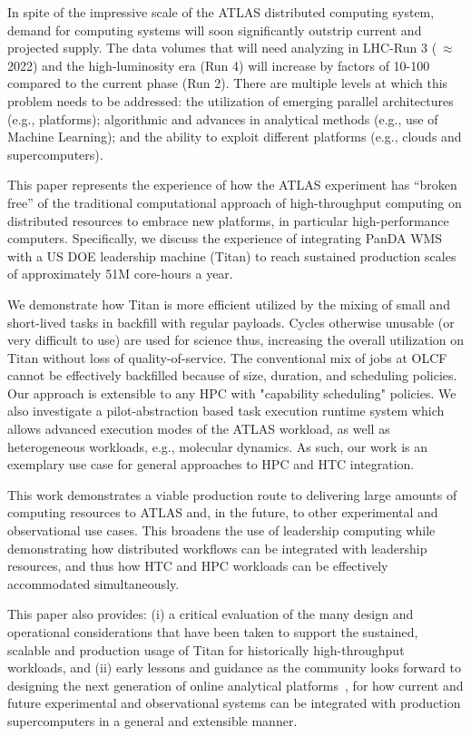 In spite of the impressive scale of the ATLAS distributed computing system,
demand for computing systems will soon significantly outstrip current and
projected supply.   The data volumes that will need analyzing in LHC-Run 3 
($~\approx$ 2022) and the high-luminosity era (Run 4) will increase by factors
of 10-100 compared to the current phase (Run 2). There are multiple levels at
which this problem needs to be addressed: the utilization of emerging parallel
architectures (e.g., platforms); algorithmic and advances in analytical
methods (e.g., use of Machine Learning); and the ability to exploit different
platforms (e.g., clouds and supercomputers).


This paper represents the experience of how the ATLAS experiment has ``broken
free'' of the traditional computational approach of high-throughput computing
on distributed resources to embrace new platforms, in particular  
high-performance computers. Specifically, we discuss the experience of integrating
PanDA WMS with a US DOE leadership machine (Titan) to reach
sustained production scales of approximately 51M core-hours a year. 

We demonstrate how Titan is more efficient utilized by the mixing of small and
short-lived tasks in backfill with regular payloads. Cycles otherwise unusable
(or very difficult to use) are used for science thus, increasing the overall
utilization on Titan without loss of quality-of-service. The conventional mix
of jobs at OLCF cannot be effectively backfilled because of size, duration,
and scheduling policies. Our approach is extensible to any HPC with
"capability scheduling" policies.  We also investigate a pilot-abstraction
based task execution runtime system which allows advanced execution modes of
the ATLAS workload, as well as heterogeneous workloads, e.g., molecular
dynamics. As such, our work is an exemplary use case for general approaches to
HPC and HTC integration.

This work demonstrates a viable production route to delivering large amounts
of computing resources to ATLAS and, in the future, to other experimental and
observational use cases.  This broadens the use of leadership computing while
demonstrating how distributed workflows can be integrated with leadership
resources, and thus how HTC and HPC workloads can be effectively accommodated
simultaneously. 

This paper also provides: (i) a critical evaluation of the many design and
operational considerations that have been taken to support the sustained,
scalable and production usage of Titan for historically high-throughput
workloads, and (ii) early lessons and guidance as the community looks forward
to designing the next generation of online analytical platforms~\cite{foap-
url}, for how current and future experimental and observational systems can be
integrated with production supercomputers in a general and extensible manner.
